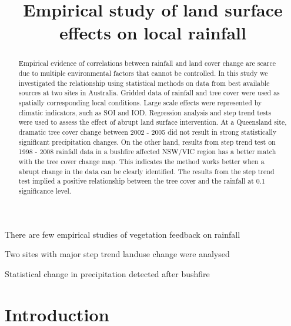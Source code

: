 \documentclass[draft,linenumbers]{agujournal}
\begin{document}


\title{Empirical study of land surface effects on local rainfall}




\begin{keypoints}
\item There are few empirical studies of vegetation feedback on rainfall 
\item Two sites with major step trend landuse change were analysed
\item Statistical change in precipitation detected after bushfire
\end{keypoints}


\begin{abstract}
Empirical evidence of correlations between rainfall and land cover change are scarce due to multiple environmental factors that cannot be controlled. In this study we investigated the relationship using statistical methods on data from best available sources at two sites in Australia. Gridded data of rainfall and tree cover were used as spatially corresponding local conditions. Large scale effects were represented by climatic indicators, such as SOI and IOD. Regression analysis and step trend tests were used to assess the effect of abrupt land surface intervention. At a Queensland site, dramatic tree cover change between 2002 - 2005 did not result in strong statistically significant precipitation changes. On the other hand, results from step trend test on 1998 - 2008 rainfall data in a bushfire affected NSW/VIC region has a better match with the tree cover change map. This indicates the method works better when a abrupt change in the data can be clearly identified. The results from the step trend test implied a positive relationship between the tree cover and the rainfall at 0.1 significance level. 
\end{abstract}

\section{Introduction}
\end{document}
